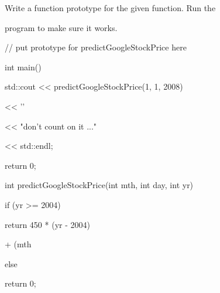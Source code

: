 Write a function prototype for the given function. Run the

program to make sure it works.

\begin{consolethree}[escapeinside=||]

// put prototype for predictGoogleStockPrice here



int main()

{

    std::cout << predictGoogleStockPrice(1, 1, 2008)

              << '\n'

              << "don't count on it ..."

              << std::endl;

    return 0;

}



int predictGoogleStockPrice(int mth, int day, int yr)

{

    if (yr >= 2004)

    {

        return 450 * (yr - 2004)

               + (mth %

    }

    else

    {

        return 0;

    }

}

\end{consolethree}

